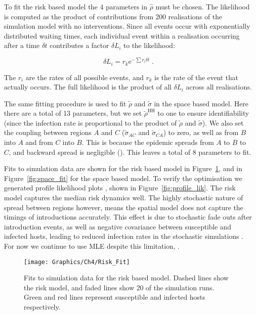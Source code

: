 To fit the risk based model the 4 parameters in $\hat{\rho}$ must be chosen. The likelihood is computed as the product of contributions from 200 realisations of the simulation model with no interventions. Since all events occur with exponentially distributed waiting times, each individual event within a realisation occurring after a time $\delta{}t$ contributes a factor $\delta{}L_i$ to the likelihood:
\begin{linenomath*}
$$\delta{}L_i = r_k\mathrm{e}^{-\sum{}r_i\delta{}t}\;.$$
\end{linenomath*}
The $r_i$ are the rates of all possible events, and $r_k$ is the rate of the event that actually occurs. The full likelihood is the product of all $\delta{}L_i$ across all realisations. 

The same fitting procedure is used to fit $\tilde{\rho}$ and $\tilde{\sigma}$ in the space based model. Here there are a total of 13 parameters, but we set $\tilde{\rho}^\mathrm{HH}$ to one to ensure identifiability (since the infection rate is proportional to the product of $\tilde{\rho}$ and $\tilde{\sigma}$). We also set the coupling between regions $A$ and $C$ ($\tilde{\sigma}_{AC}$ and $\tilde{\sigma}_{CA}$) to zero, as well as from $B$ into $A$ and from $C$ into $B$. This is because the epidemic spreads from $A$ to $B$ to $C$, and backward spread is negligible (). This leaves a total of 8 parameters to fit.

Fits to simulation data are shown for the risk based model in Figure~\ref{fig:risk_fit}, and in Figure~\ref{fig:space_fit} for the space based model. To verify the optimisation we generated profile likelihood plots \citep{bolker_ecological_2008}, shown in Figure~\ref{fig:profile_lik}. The risk model captures the median risk dynamics well. The highly stochastic nature of spread between regions however, means the spatial model does not capture the timings of introductions accurately. This effect is due to stochastic fade outs after introduction events, as well as negative covariance between susceptible and infected hosts, leading to reduced infection rates in the stochastic simulations \citep[pp.~227--229 and pp.~238--240]{keeling_modeling_2008}. For now we continue to use MLE despite this limitation, .

\begin{figure}[h]
    \begin{center}
        \texttt{[image: Graphics/Ch4/Risk\_Fit]}
        \caption{Fits to simulation data for the risk based model. Dashed lines show the risk model, and faded lines show 20 of the simulation runs. Green and red lines represent susceptible and infected hosts respectively.}
        \label{fig:risk_fit}
    \end{center}
\end{figure}

